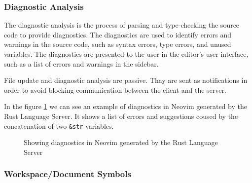 \subsubsection{Diagnostic Analysis}\label{subsubsec:background:DiagnosticAnalysis}

The diagnostic analysis is the process of parsing and type-checking the source code to provide diagnostics. The diagnostics are used to identify errors and warnings in the source code, such as syntax errors, type errors, and unused variables. The diagnostics are presented to the user in the editor's user interface, such as a list of errors and warnings in the sidebar.

File update and diagnostic analysis are passive. Thay are sent as notifications in order to avoid blocking communication between the client and the server.

In the figure \ref{fig:diagnostic} we can see an example of diagnostics in Neovim generated by the Rust Language Server. It shows a list of errors and suggestions coused by the concatenation of two \texttt{\&str} variables.

\begin{figure}[t]
    \centering
    \caption{Showing diagnostics in Neovim generated by the Rust Language Server}
    \label{fig:diagnostic}
\end{figure}

\subsubsection{Workspace/Document Symbols}\label{subsubsec:background:WorkspaceDocumentSymbols}

\hfill \break

